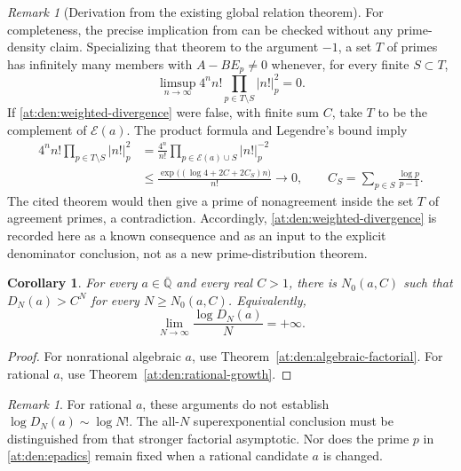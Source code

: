 \documentclass[11pt,a4paper]{article}
\newcommand{\Qbar}{\overline{\mathbb Q}}
\newtheorem{corollary}[theorem]{Corollary}
\theoremstyle{definition}
\theoremstyle{remark}
\newtheorem{remark}[theorem]{Remark}
\numberwithin{equation}{section}
\begin{document}
\begin{remark}[Derivation from the existing global relation theorem]
\label{at:den:prior-global-relation}
For completeness, the precise implication from
\cite[Theorem~1]{at:Ernvall2018} can be checked without any prime-density
claim.  Specializing that theorem to the argument $-1$, a set $T$ of
primes has infinitely many members with $A-BE_p\ne0$ whenever, for
every finite $S\subset T$,
\begin{equation}\label{at:den:prior-condition}
 \limsup_{n\to\infty}
 4^n n!\prod_{p\in T\setminus S}|n!|_p^2=0.
\end{equation}
If \eqref{at:den:weighted-divergence} were false, with finite sum $C$,
take $T$ to be the complement of $\mathcal E(a)$.  The product formula
and Legendre's bound imply
\begin{align*}
 4^n n!\prod_{p\in T\setminus S}|n!|_p^2
 &=\frac{4^n}{n!}
   \prod_{p\in\mathcal E(a)\cup S}|n!|_p^{-2}\\
 &\leq\frac{\exp\bigl((\log4+2C+2C_S)n\bigr)}{n!}
 \longrightarrow0,
 \qquad C_S=\sum_{p\in S}\frac{\log p}{p-1}.
\end{align*}
The cited theorem would then give a prime of nonagreement inside the
set $T$ of agreement primes, a contradiction.  Accordingly,
\eqref{at:den:weighted-divergence} is recorded here as a known consequence
and as an input to the explicit denominator conclusion, not as a new
prime-distribution theorem.
\end{remark}

\begin{corollary}\label{at:den:all-algebraic}
For every $a\in\Qbar$ and every real $C>1$, there is $N_0(a,C)$
such that $D_N(a)>C^N$ for every $N\geq N_0(a,C)$.  Equivalently,
\[
 \lim_{N\to\infty}\frac{\log D_N(a)}N=+\infty.
\]
\end{corollary}

\begin{proof}
For nonrational algebraic $a$, use
Theorem~\ref{at:den:algebraic-factorial}.  For rational $a$, use
Theorem~\ref{at:den:rational-growth}.
\end{proof}

\begin{remark}
For rational $a$, these arguments do not establish
$\log D_N(a)\sim\log N!$.  The all-$N$ superexponential conclusion
must be distinguished from that stronger factorial asymptotic.
Nor does the prime $p$ in \eqref{at:den:epadics} remain fixed when a
rational candidate $a$ is changed.
\end{remark}
\end{document}
